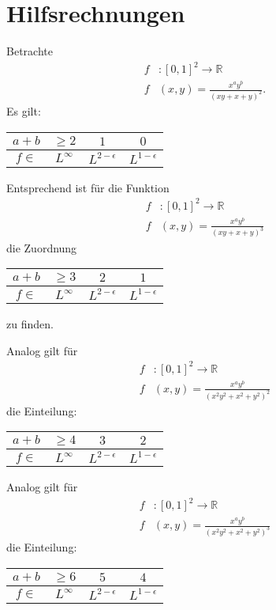 \documentclass[10pt,a4paper]{report}
\author{Ludwig Paul Lind}
\begin{document}
\chapter{Hilfsrechnungen}
Betrachte
\begin{align*}
f&: \left[0,1\right]^2 \rightarrow \mathbb{R} \\
f& \left(x, y\right) = \frac{x^a y^b}{\left(xy+x+y\right)^2}.
\end{align*}
Es gilt:
\begin{table}[H]
\centering
\begin{tabular}{|c||c|c|c|}
\hline 
$a+b$ & $\geq 2$ & $1$ & $0$ \\ 
\hline 
$f \in$ & $L^{\infty}$ & $L^{2-\epsilon}$ & $L^{1-\epsilon}$ \\ 
\hline 
\end{tabular} 
\end{table}

Entsprechend ist für die Funktion
\begin{align*}
f&: \left[0,1\right]^2 \rightarrow \mathbb{R} \\
f& \left(x, y\right) = \frac{x^a y^b}{\left(xy+x+y\right)^3}
\end{align*}
die Zuordnung
\begin{table}[H]
\centering
\begin{tabular}{|c||c|c|c|}
\hline 
$a+b$ & $\geq 3$ & $2$ & $1$ \\ 
\hline 
$f \in$ & $L^{\infty}$ & $L^{2-\epsilon}$ & $L^{1-\epsilon}$ \\ 
\hline 
\end{tabular}
\end{table} 
zu finden.

Analog gilt für
\begin{align*}
f&: \left[0,1\right]^2 \rightarrow \mathbb{R} \\
f& \left(x, y\right) = \frac{x^a y^b}{\left(x^2y^2+x^2+y^2\right)^2}
\end{align*}
die Einteilung:
\begin{table}[H]
\centering
\begin{tabular}{|c||c|c|c|}
\hline 
$a+b$ & $\geq 4$ & $3$ & $2$ \\ 
\hline 
$f \in$ & $L^{\infty}$ & $L^{2-\epsilon}$ & $L^{1-\epsilon}$\\ 
\hline 
\end{tabular}
\end{table} 

Analog gilt für
\begin{align*}
f&: \left[0,1\right]^2 \rightarrow \mathbb{R} \\
f& \left(x, y\right) = \frac{x^a y^b}{\left(x^2y^2+x^2+y^2\right)^3}
\end{align*}
die Einteilung:
\begin{table}[H]
\centering
\begin{tabular}{|c||c|c|c|}
\hline 
$a+b$ & $\geq 6$ & $5$ & $4$ \\ 
\hline 
$f \in$ & $L^{\infty}$ & $L^{2-\epsilon}$ & $L^{1-\epsilon}$\\ 
\hline 
\end{tabular}
\end{table} 
\end{document}
